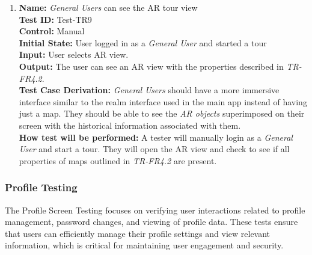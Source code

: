 \documentclass[12pt, titlepage]{article}
\begin{document}
\begin{enumerate}
  \item
        \textbf{Name:} \textit{General Users} can see the AR tour view \label{itm:Test-TR9} \\
        \textbf{Test ID:} Test-TR9 \\
        \textbf{Control:} Manual \\
        \textbf{Initial State:} User logged in as a \textit{General User} and started a tour \\
        \textbf{Input:} User selects AR view. \\
        \textbf{Output:} The user can see an AR view with the properties described in \textit{TR-FR4.2}. \\
        \textbf{Test Case Derivation:} \textit{General Users} should have a more immersive interface similar to the realm interface used in the main app instead of having just a map. They should be able to see the \textit{AR objects} superimposed on their screen with the historical information associated with them. \\
        \textbf{How test will be performed:} A tester will manually login as a \textit{General User} and start a tour. They will open the AR view and check to see if all properties of maps outlined in \textit{TR-FR4.2} are present.

\end{enumerate}

\subsubsection{Profile Testing}
\label{sec:profile_screen_testing}

The Profile Screen Testing focuses on verifying user interactions related to profile management, password changes, and viewing of profile data. These tests ensure that users can efficiently manage their profile settings and view relevant information, which is critical for maintaining user engagement and security.
\end{document}
